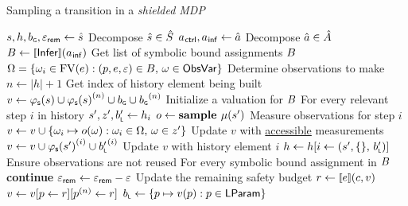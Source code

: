 \begin{algorithm}
  \caption{Sampling a transition in a \emph{shielded MDP}}\label{alg:shield}
  \begin{algorithmic}[1]
      \State $s, h, b_\textsf{\tiny G}, \varepsilon_{\mathsf{rem}} \gets \hat s$ \Comment Decompose $\hat s \in \hat S$
      \State $a_{\mkern1mu\mathsf{ctrl}}, a_{\mkern1mu\mathsf{inf}} \gets \hat a$ \Comment Decompose $\hat a \in \hat A$
      \State $\InfResult \gets \sem{\Inference}(\InfAc)$ \Comment Get list of symbolic bound assignments $B$ \label{line:inf-start} \label{line:algo-start}
      \State $\Omega = \{ \omega_i \in \operatorname{FV}(e) : (p, e, \varepsilon) \in B, \, \omega \in \mathsf{ObsVar} \}$ \Comment Determine observations to make
      \State $n \gets |h| + 1$ \Comment Get index of history element being built
      \State $v \gets \varphi_{\mathsf{s}}(s) \cup {\varphi_{\mathsf{s}}(s)}^{(n)} \cup b_\textsf{\tiny G} \cup {b_\textsf{\tiny G}}^{(n)}$ \Comment Initialize a valuation for $B$
       \Comment For every relevant step $i$ in history
        \State $s', z', b_\textsf{\tiny L}' \gets h_i$ %
        \State $o \gets \textbf{sample } \mu(s')$ \Comment Measure observations for step $i$ \label{line:lazy-measurement}
        \State $v \gets v \cup \{ \omega_i \mapsto o(\omega) : \omega_i \in \Omega, \, \omega \in z' \}$ \Comment Update $v$ with \underline{accessible} measurements
        \State $v \gets v \cup {\varphi_{\mathsf{s}}(s')}^{(i)} \cup {b_\textsf{\tiny L}'}^{(i)}$ \Comment Update $v$ with history element $i$
        \State $h \gets {h}[{i} \gets {(s', \{\}, \, b_\textsf{\tiny L}')}]$ \Comment Ensure observations are not reused
      \EndFor
       \Comment For every symbolic bound assignment in $B$ \label{line:start-exec-inference}
        \If{$\Eps > \EpsRem$} 
          \State \textbf{continue} 
        \EndIf
        \State $\varepsilon_{\mathsf{rem}} \gets \varepsilon_{\mathsf{rem}} - \varepsilon$ \Comment Update the remaining safety budget
        \State $r \gets \sem{e}(c, v)$ 
         
          \State $v \gets {{v}[{p} \gets {r}]}[{{p}^{(n)}} \gets {r}]$ 
        \EndIf
      \EndFor
      \State $b_\textsf{\tiny L} \gets \{p \mapsto v(p) : p \in \mathsf{LParam}\}$ \

\end{algorithmic}
\end{algorithm}
